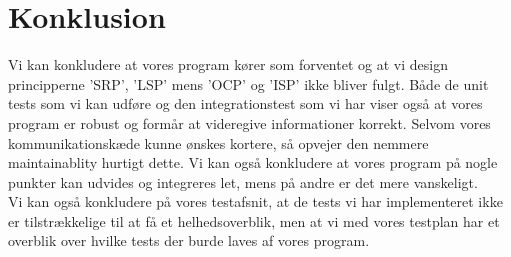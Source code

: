 \section{Konklusion}
Vi kan konkludere at vores program kører som forventet og at vi design principperne 'SRP', 'LSP' mens 'OCP' og 'ISP' ikke bliver fulgt. Både de unit tests som vi kan udføre og den integrationstest som vi har viser også at vores program er robust og formår at videregive informationer korrekt. Selvom vores kommunikationskæde kunne ønskes kortere, så opvejer den nemmere maintainablity hurtigt dette. Vi kan også konkludere at vores program på nogle punkter kan udvides og integreres let, mens på andre er det mere vanskeligt.\\
Vi kan også konkludere på vores testafsnit, at de tests vi har implementeret ikke er tilstrækkelige til at få et helhedsoverblik, men at vi med vores testplan har et overblik over hvilke tests der burde laves af vores program.
